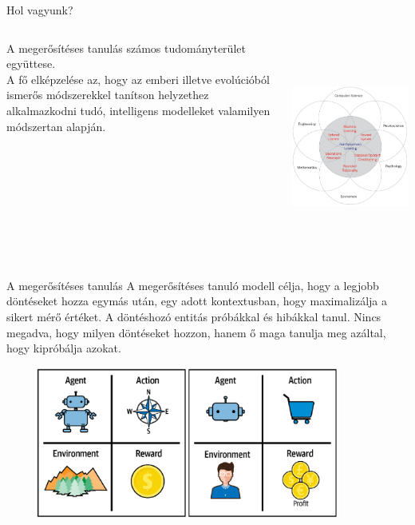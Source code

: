 \documentclass[english, aspectratio=169]{beamer}
\begin{document}
\begin{frame}{Hol vagyunk?}
\begin{columns}
\begin{column}{.5\textwidth}
A megerősítéses tanulás számos tudományterület együttese.\\
A fő elképzelése az, hogy az emberi illetve evolúcióból ismerős módszerekkel tanítson helyzethez alkalmazkodni tudó, intelligens modelleket valamilyen módszertan alapján. 
\end{column}
\begin{column}{.5\textwidth}
\begin{center}
\includegraphics[height=7cm, width=12cm, keepaspectratio]{images/reinf_1.png}
\end{center}
\end{column}
\end{columns}
\end{frame}

\begin{frame}{A megerősítéses tanulás}
A megerősítéses tanuló modell célja, hogy a legjobb döntéseket hozza egymás után, egy adott kontextusban, hogy maximalizálja a sikert mérő értéket. A döntéshozó entitás próbákkal és hibákkal tanul. Nincs megadva, hogy milyen döntéseket hozzon, hanem ő maga tanulja meg azáltal, hogy kipróbálja azokat.
\begin{center}
\includegraphics[width=12cm, height=5cm, keepaspectratio]{images/reinf_2.png}
\end{center}
\end{frame}
\end{document}
